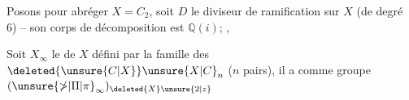 Posons pour abréger $X=C_2$, soit $D$ le diviseur de ramification sur $X$ (de degré 6) -- son corps de décomposition est $\mathbb{Q}(i)$; , 

Soit $X_\infty$ le   de $X$ défini par la famille des $\deleted{\unsure{C|X}}\unsure{X|C}_n$ ($n$ pairs), il a comme groupe $(\unsure{\mathbb{\Pi}|\Pi|\pi}_\infty)_{\deleted{X}\unsure{2|z}}$

